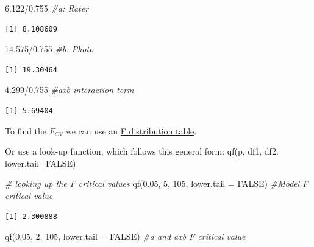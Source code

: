 \documentclass[
  11pt,
]{book}
\newenvironment{Shaded}{\begin{snugshade}}{\end{snugshade}}
\newcommand{\AttributeTok}[1]{\textcolor[rgb]{0.77,0.63,0.00}{#1}}
\newcommand{\CommentTok}[1]{\textcolor[rgb]{0.56,0.35,0.01}{\textit{#1}}}
\newcommand{\ConstantTok}[1]{\textcolor[rgb]{0.00,0.00,0.00}{#1}}
\newcommand{\DecValTok}[1]{\textcolor[rgb]{0.00,0.00,0.81}{#1}}
\newcommand{\FloatTok}[1]{\textcolor[rgb]{0.00,0.00,0.81}{#1}}
\newcommand{\FunctionTok}[1]{\textcolor[rgb]{0.00,0.00,0.00}{#1}}
\newcommand{\NormalTok}[1]{#1}
\newcommand{\SpecialCharTok}[1]{\textcolor[rgb]{0.00,0.00,0.00}{#1}}
\begin{document}
\begin{Shaded}
\begin{Highlighting}[]
\FloatTok{6.122}\SpecialCharTok{/}\FloatTok{0.755}  \CommentTok{\#a: Rater}
\end{Highlighting}
\end{Shaded}

\begin{verbatim}
[1] 8.108609
\end{verbatim}

\begin{Shaded}
\begin{Highlighting}[]
\FloatTok{14.575}\SpecialCharTok{/}\FloatTok{0.755}  \CommentTok{\#b:  Photo}
\end{Highlighting}
\end{Shaded}

\begin{verbatim}
[1] 19.30464
\end{verbatim}

\begin{Shaded}
\begin{Highlighting}[]
\FloatTok{4.299}\SpecialCharTok{/}\FloatTok{0.755}  \CommentTok{\#axb interaction term}
\end{Highlighting}
\end{Shaded}

\begin{verbatim}
[1] 5.69404
\end{verbatim}

To find the \(F_{CV}\) we can use an \href{https://www.statology.org/f-distribution-table/}{F distribution table}.

Or use a look-up function, which follows this general form: qf(p, df1, df2. lower.tail=FALSE)

\begin{Shaded}
\begin{Highlighting}[]
\CommentTok{\# looking up the F critical values}
\FunctionTok{qf}\NormalTok{(}\FloatTok{0.05}\NormalTok{, }\DecValTok{5}\NormalTok{, }\DecValTok{105}\NormalTok{, }\AttributeTok{lower.tail =} \ConstantTok{FALSE}\NormalTok{)  }\CommentTok{\#Model F critical value}
\end{Highlighting}
\end{Shaded}

\begin{verbatim}
[1] 2.300888
\end{verbatim}

\begin{Shaded}
\begin{Highlighting}[]
\FunctionTok{qf}\NormalTok{(}\FloatTok{0.05}\NormalTok{, }\DecValTok{2}\NormalTok{, }\DecValTok{105}\NormalTok{, }\AttributeTok{lower.tail =} \ConstantTok{FALSE}\NormalTok{)  }\CommentTok{\#a and axb F critical value}
\end{Highlighting}
\end{Shaded}
\end{document}
